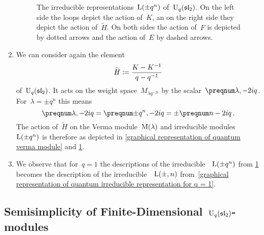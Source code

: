 \documentclass[a4paper, 11pt, oneside]{scrartcl}
\begin{document}
\begin{remark}
\begin{enumerate}
\begin{figure}[t]
\begin{center}
        \end{center}
        \caption{
          The irreducible representations~$\operatorname{L}(\pm q^n)$ of~$\operatorname{U}_q(\mathfrak{sl}_2)$.
          On the left side the loops depict the action of~$K$, an on the right side they depict the action of~$\widetilde{H}$.
          On both sides the action of~$F$ is depicted by dotted arrows and the action of~$E$ by dashed arrows.
        }
        \label{graphical representation of irreducible quantum representation}
      \end{figure}
    \item
      We can consider again the element
      \[
        \widetilde{H}
        \coloneqq
        \frac{K - K^{-1}}{q - q^{-1}}
      \]
      of~$\operatorname{U}_q(\mathfrak{sl}_2)$.
      It acts on the weight space~$M_{\lambda q^{-2i}}$ by the scalar~$\qnum{\lambda, -2i}$.
      For~$\lambda = \pm q^n$ this means
      \[
        \qnum{\lambda, -2i}
        =
        \qnum{\pm q^n, -2i}
        =
        \pm \qnum{n - 2i} \,.
      \]
      The action of~$\widetilde{H}$ on the Verma module~$\operatorname{M}(\lambda)$ and irreducible modules~$\operatorname{L}(\pm q^n)$ is therefore as depicted in \cref{graphical representation of quantum verma module} and \cref{graphical representation of irreducible quantum representation}.
    \item
      We observe that for~$q = 1$ the descriptions of the irreducible~~$\operatorname{L}(\pm q^n)$ from \cref{graphical representation of irreducible quantum representation} becomes the description of the irreducible~~$\operatorname{L}(\pm, n)$ from~\cref{graphical representation of quantum irreducible representation for q = 1}.
  \end{enumerate}
\end{remark}



\subsection{Semisimplicity of Finite-Dimensional~$\operatorname{U}_q(\mathfrak{sl}_2)$-modules}
\end{document}
